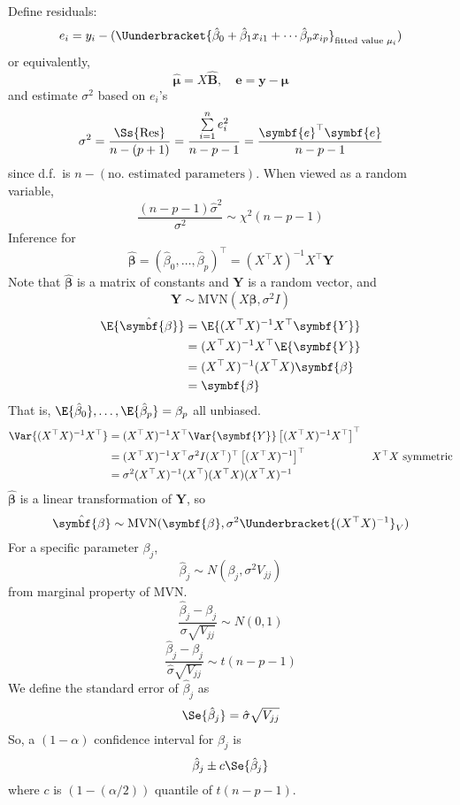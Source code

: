 Define residuals:
\[ e_i=y_i-(\Uunderbracket{\hat{\beta}_0+\hat{\beta}_1x_{i1}+\cdots\hat{\beta}_p x_{ip}
    }_{\text{fitted value }\mu_i}) \]
or equivalently,
\[ \hat{\symbf{\mu}}=X\hat{\symbf{B}},\quad \symbf{e}=\symbf{y}-\symbf{\mu} \]
and estimate $ \sigma^2 $ based on $ e_i $'s
\[ \sigma^2=\frac{\Ss{\text{Res}}}{n-(p+1)}=
    \frac{\sum\limits_{i=1}^{n} e_i^2}{n-p-1}=\frac{\symbf{e}^\top\symbf{e}}{n-p-1}  \]
since d.f.\ is $ n-(\text{no.\ estimated parameters}) $. When viewed
as a random variable,
\[ \frac{(n-p-1)\hat{\sigma}^2}{\sigma^2}\sim \chi^2(n-p-1)  \]
Inference for
\[ \hat{\symbf{\beta}}=(\hat{\beta}_0,\ldots,\hat{\beta}_p)^\top
    =(X^\top X)^{-1}X^\top \symbf{Y} \]
Note that $ \hat{\symbf{\beta}} $ is a matrix of constants and
$ \symbf{Y} $ is a random vector, and
\[ \symbf{Y}\sim \text{MVN}(X\symbf{\beta},\sigma^2 I) \]
\begin{align*}
    \E{\hat{\symbf{\beta}}}
     & =\E{(X^\top X)^{-1}X^\top \symbf{Y}}    \\
     & =(X^\top X)^{-1}X^\top\E{\symbf{Y}}     \\
     & =(X^\top X)^{-1}(X^\top X)\symbf{\beta} \\
     & =\symbf{\beta}
\end{align*}
That is, $ \E{\hat{\beta}_0},\ldots,\E{\hat{\beta}_p}=\beta_p $
all unbiased.
\begin{align*}
    \Var{(X^\top X)^{-1}X^\top}
     & =(X^\top X)^{-1}X^{\top}\Var{\symbf{Y}}\left[ (X^\top X)^{-1}X^\top \right]^\top                              \\
     & =(X^\top X)^{-1}X^\top \sigma^2 I(X^\top)^\top\left[ (X^\top X)^{-1} \right]^\top & X^\top X\text{ symmetric} \\
     & =\sigma^2(X^\top X)^{-1}(X^\top)(X^\top X)(X^\top X)^{-1}
\end{align*}
$ \hat{\symbf{\beta}} $ is a linear transformation of $ \symbf{Y} $, so
\[ \hat{\symbf{\beta}} \sim \text{MVN}(\symbf{\beta},\sigma^2
    \Uunderbracket{(X^\top X)^{-1}}_{V}) \]
For a specific parameter $ \beta_j $,
\[ \hat{\beta}_j \sim N(\beta_j,\sigma^2 V_{jj}) \]
from marginal property of MVN.\
\[ \frac{\hat{\beta}_j-\beta_j}{\sigma\sqrt{V_{jj}}} \sim N(0,1)  \]
\[ \frac{\hat{\beta}_j-\beta_j}{\hat{\sigma}\sqrt{V_{jj}}} \sim t(n-p-1)  \]
We define the standard error of $ \hat{\beta}_j $ as
\[ \Se{\hat{\beta}_j}=\hat{\sigma}\sqrt{V_{jj}} \]
So, a $ (1-\alpha) $ confidence interval for $ \beta_j $
is
\[ \hat{\beta}_j\pm c\Se{\hat{\beta}_j} \]
where $ c $ is $ (1-(\alpha/2)) $ quantile of $ t(n-p-1) $.

